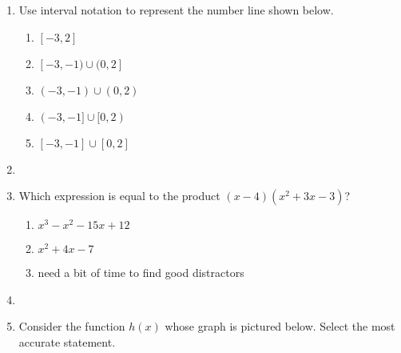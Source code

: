 \documentclass{article}
\begin{document}
\begin{enumerate}
    \item Use interval notation to represent the number line shown below.
    \begin{center}
        \end{center}
    
    
        \begin{enumerate}
            \item $[-3,2]$
            \item $[-3,-1) \cup (0,2] $ %
            \item $(-3,-1) \cup (0,2) $
            \item $(-3,-1] \cup [0,2) $
            \item $[-3,-1] \cup [0,2] $
        \end{enumerate}
    
    \item
    
    \item Which expression is equal to the product $(x-4)(x^2+3x-3)$?
    \begin{enumerate}
        \item $x^3 - x^2 - 15 x + 12$ %
        \item $x^2 + 4x - 7$ %
        \item need a bit of time to find good distractors
    \end{enumerate}
    
    \item
    
    \item Consider the function $h(x)$ whose graph is pictured below. Select the most accurate statement.
    

\end{enumerate}
\end{document}
